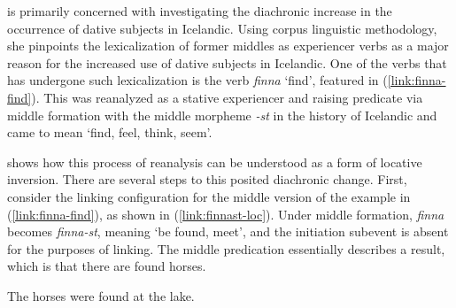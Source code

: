 \documentclass[output=paper,hidelinks]{langscibook}
\begin{document}
\citet{schaetzle18} is primarily concerned with investigating the diachronic
increase in the occurrence of dative subjects in Icelandic.   Using
corpus linguistic methodology, she pinpoints the lexicalization of former
middles as experiencer verbs as a major reason for the increased use of dative
subjects in Icelandic.  One of the verbs that has undergone such lexicalization
is the verb \textit{finna} `find', featured in (\ref{link:finna-find}). This
was reanalyzed as a stative experiencer and raising predicate via middle
formation with the middle morpheme \textit{-st} in the history of Icelandic and
came to mean  `find, feel, think, seem'.

\citet{schaetzle18} shows how this process of reanalysis can be understood as a
form of locative inversion.  There are several steps to this posited diachronic
change.  First, consider the linking configuration for the middle version of the
example in (\ref{link:finna-find}), as shown in (\ref{link:finnast-loc}). 
Under middle formation, \textit{finna} becomes \mbox{\textit{finna-st}}, meaning `be
found, meet', and the initiation subevent is absent for the purposes of
linking. The middle predication essentially describes a result, which is that there 
are found horses.


\ea  \label{link:finnast-loc} 
The horses were found at the lake.
\z 

\hspace{1.1cm}
\end{document}
